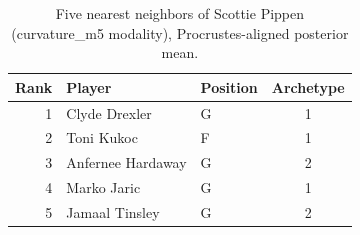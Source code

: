 \begin{table}[htbp]
  \centering\small
  \begin{tabular}{rllc}
    \toprule
    Rank & Player & Position & Archetype \\
    \midrule
    1 & Clyde Drexler & G & 1 \\
    2 & Toni Kukoc & F & 1 \\
    3 & Anfernee Hardaway & G & 2 \\
    4 & Marko Jaric & G & 1 \\
    5 & Jamaal Tinsley & G & 2 \\
    \bottomrule
  \end{tabular}
  \caption{Five nearest neighbors of Scottie Pippen (curvature_m5 modality), Procrustes-aligned posterior mean.}
  \label{tab:Scottie_Pippen_neighbors_curvature_m5}
\end{table}

